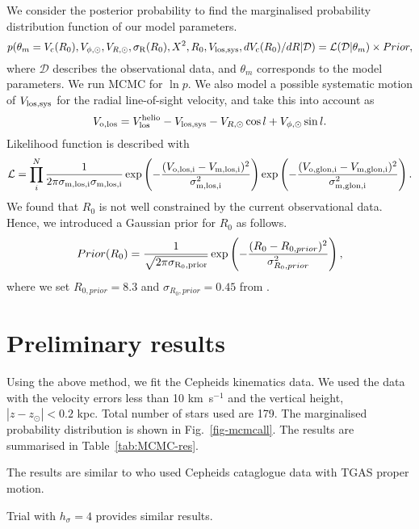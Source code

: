 \documentclass[11pt,a4paper]{article}
\begin{document}
We consider the posterior probability to find the marginalised probability distribution function of our model parameters.
\begin{equation}
 p(\theta_m=V_{\rm c}(R_0), V_{\phi,\odot}, V_{R,\odot}, \sigma_{\rm R}(R_0), X^2, R_0, V_{\rm los,sys}, dV_{\rm c}(R_0)/dR| \mathcal{D})
 = \mathcal L(\mathcal{D}|\theta_m) \times Prior,
\end{equation} 
where $\mathcal{D}$ describes the observational data, and $\theta_m$ corresponds to the model parameters. We run MCMC for $\ln p$. We also model a possible systematic motion of $V_{\rm los,sys}$ for the radial line-of-sight velocity, and take this into account as
\begin{equation}
V_{\rm o,los} = V_{\rm los}^{\rm helio}-V_{\rm los,sys} - V_{R,\odot} \cos l + V_{\rm \phi,\odot} \sin l.
\end{equation}
Likelihood function is described with 
\begin{equation}
\mathcal{L}=\prod_i^N \frac{1}{2 \pi \sigma_{\rm m,los,i} \sigma_{\rm m,los,i}} 
 \exp\left(-\frac{(V_{\rm o,los,i}-V_{\rm m,los,i})^2}{\sigma_{\rm m,los,i}^2}\right)
  \exp\left(-\frac{(V_{\rm o,glon,i}-V_{\rm m,glon,i})^2}{\sigma_{\rm m,glon,i}^2}\right).
\end{equation}
We found that $R_0$ is not well constrained by the current observational data. Hence, we introduced a Gaussian prior for $R_0$ as follows.
\begin{equation}
 Prior(R_0)= \frac{1}{\sqrt{2 \pi \sigma_{\rm R_0,prior}}}  \exp\left(-\frac{(R_0-R_{0,prior})^2}{\sigma_{R_0,prior}^2}\right),
\end{equation}
where we set $R_{0,prior}=8.3$ and $\sigma_{R_0,prior}=0.45$ from \citep{rdggb16}.

\section{Preliminary results}

Using the above method, we fit the Cepheids kinematics data. We used the data with the velocity errors less than 10 km~s$^{-1}$ and the vertical height, $|z-z_{\odot}|<0.2$ kpc. Total number of stars used are 179.  The marginalised probability distribution is shown in Fig.~\ref{fig-mcmcall}. The results are summarised in Table~\ref{tab:MCMC-res}.

The results are similar to \citet{vvb17a} who used Cepheids cataglogue data with TGAS proper motion. 

Trial with $h_{\sigma}=4$ provides similar results. 
\end{document}
